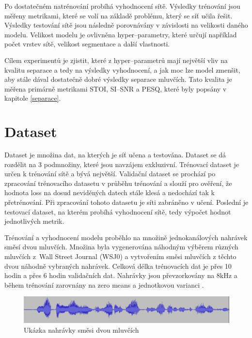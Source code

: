 Po dostatečném natrénování probíhá vyhodnocení sítě. Výsledky trénování jsou měřeny metrikami, které se volí na základě problému, který se síť učila řešit. Výsledky testování sítě jsou následně porovnávány v závislosti na velikosti daného modelu. Velikost modelu je ovlivněna hyper--parametry, které určují například počet vrstev sítě, velikost segmentace a další vlastnosti.

Cílem experimentů je zjistit, které z hyper--parametrů mají největší vliv na kvalitu separace a tedy na výsledky vyhodnocení, a jak moc lze model zmenšit, aby stále dával dostatečně dobré výsledky separace mluvčích. Tato kvalita je měřena primárně metrikami STOI, SI--SNR a PESQ, které byly popsány v kapitole \ref{separace}.


\section{Dataset}
Dataset je množina dat, na kterých je síť učena a testována. Dataset se dá rozdělit na 3 podmnožiny, které jsou navzájem exkluzivní. Trénovací dataset je určen k trénování sítě a bývá největší. Validační dataset se prochází po zpracování trénovacího datasetu v průběhu trénování a slouží pro ověření, že hodnota loss na dosud neviděných datech stále klesá a nedochází tak k přetrénování. Při zpracování tohoto datasetu je síti zabráněno v učení. Poslední je testovací dataset, na kterém probíhá vyhodnocení sítě, tedy výpočet hodnot jednotlivých metrik. 

Trénování a vyhodnocení modelu proběhlo na množině jednokanálových nahrávek směsí dvou mluvčích. Množina byla vygenerována náhodným výběrem různých mluvčích z~Wall Street Journal (WSJ0) a vytvořením směsi mluvčích z těchto dvou náhodně vybraných nahrávek. Celková délka trénovacích dat je přes 10 hodin a přes 6 hodin validačních dat. Nahrávky jsou převzorkovány na 8kHz a během trénování zarovnány na zero means a jednotkovou varianci .

\begin{figure}[H]
    \centering
    \includegraphics[scale=0.35]{obrazky-figures/dataset-mix.png}
    \caption{\label{fig:ref-mixture}Ukázka nahrávky směsi dvou mluvčích}
\end{figure}

